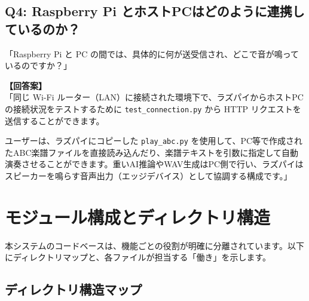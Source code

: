 \documentclass[a4paper,11pt]{jlreq}
\newcommand{\file}[1]{\texttt{\color{brand-green}#1}}
\begin{document}
\subsection{Q4: Raspberry Pi とホストPCはどのように連携しているのか？}

\begin{tcolorbox}[qbox, title=質問の要旨]
「Raspberry Pi と PC の間では、具体的に何が送受信され、どこで音が鳴っているのですか？」
\end{tcolorbox}

\begin{tcolorbox}[abox]
\textbf{【回答案】} \\
「同じ Wi-Fi ルーター（LAN）に接続された環境下で、ラズパイからホストPCの接続状況をテストするために \file{test\_connection.py} から HTTP リクエストを送信することができます。

ユーザーは、ラズパイにコピーした \file{play\_abc.py} を使用して、PC等で作成されたABC楽譜ファイルを直接読み込んだり、楽譜テキストを引数に指定して自動演奏させることができます。重いAI推論やWAV生成はPC側で行い、ラズパイはスピーカーを鳴らす音声出力（エッジデバイス）として協調する構成です。」
\end{tcolorbox}

\newpage

\section{モジュール構成とディレクトリ構造}

本システムのコードベースは、機能ごとの役割が明確に分離されています。以下にディレクトリマップと、各ファイルが担当する「働き」を示します。

\subsection{ディレクトリ構造マップ}
\end{document}

